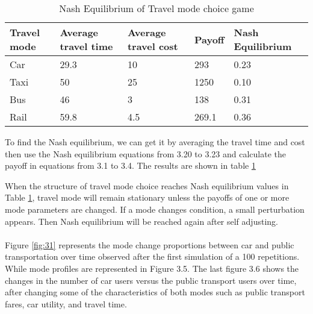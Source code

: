 \begin{table}[h!]
\centering
\begin{tabular}{lllll}
\hline
\multicolumn{1}{l}{Travel mode} & \multicolumn{1}{l}{Average travel time} & \multicolumn{1}{l}{Average travel cost} & \multicolumn{1}{l}{Payoff} & Nash~ Equilibrium  \\ 
\hline
Car                             & 29.3                                    & 10                                      & 293                        & 0.23               \\
Taxi                            & 50                                      & 25                                      & 1250                       & 0.10               \\
Bus                             & 46                                      & 3                                       & 138                        & 0.31               \\
Rail                            & 59.8                                    & 4.5                           & 269.1                      
& 0.36                   
\end{tabular}
\caption{Nash Equilibrium of Travel mode choice game}
\label{table:2}
\end{table}

To find the Nash equilibrium, we can get it by averaging the travel time and cost then use the Nash equilibrium equations from 3.20 to 3.23 and calculate the payoff in equations from 3.1 to 3.4. The results are shown in table \ref{table:2}

When the structure of travel mode choice reaches Nash equilibrium values in Table \ref{table:2}, travel mode will remain stationary unless the payoffs of one or more mode parameters are changed. If a mode changes condition, a small perturbation appears. Then Nash equilibrium will be reached again after self adjusting.
\paragraph{}
Figure \ref{fig:31} represents the mode change proportions between car and public transportation over time observed after the first simulation of a 100 repetitions. While mode profiles are represented in Figure 3.5. The last figure 3.6 shows the changes in the number of car users versus the public transport users over time, after changing some of the characteristics of both modes such as public transport fares, car utility, and travel time.

